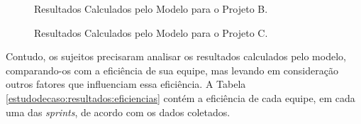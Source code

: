\begin{figure}[ht!]
\begin{center}
	\end{center}
	\caption{Resultados Calculados pelo Modelo para o Projeto B.}
	\label{estudodecaso:resultados:projetoB}
\end{figure}

\begin{figure}[ht!]
\begin{center}
	\end{center}
	\caption{Resultados Calculados pelo Modelo para o Projeto C.}
	\label{estudodecaso:resultados:projetoC}
\end{figure}

Contudo, os sujeitos precisaram analisar os resultados calculados pelo modelo, comparando-os com a eficiência de sua equipe, mas levando em consideração outros fatores que influenciam essa eficiência. A Tabela \ref{estudodecaso:resultados:eficiencias} contém a eficiência de cada equipe, em cada uma das \textit{sprints}, de acordo com os dados coletados.


